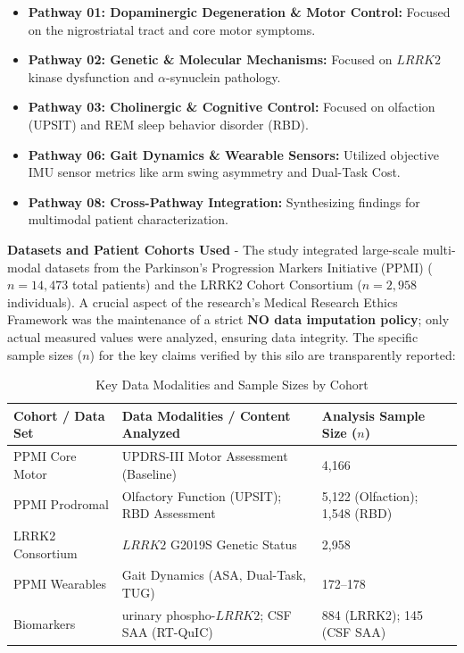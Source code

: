 \documentclass[11pt]{article}
\begin{document}
\begin{itemize}[noitemsep, topsep=0.5em, partopsep=0pt, parsep=0pt]
    \item \textbf{Pathway 01: Dopaminergic Degeneration \& Motor Control:} Focused on the nigrostriatal tract and core motor symptoms.
    \item \textbf{Pathway 02: Genetic \& Molecular Mechanisms:} Focused on $LRRK2$ kinase dysfunction and $\alpha$-synuclein pathology.
    \item \textbf{Pathway 03: Cholinergic \& Cognitive Control:} Focused on olfaction (UPSIT) and REM sleep behavior disorder (RBD).
    \item \textbf{Pathway 06: Gait Dynamics \& Wearable Sensors:} Utilized objective IMU sensor metrics like arm swing asymmetry and Dual-Task Cost.
    \item \textbf{Pathway 08: Cross-Pathway Integration:} Synthesizing findings for multimodal patient characterization.
\end{itemize}

\textbf{Datasets and Patient Cohorts Used} - 
The study integrated large-scale multi-modal datasets from the Parkinson’s Progression Markers Initiative (PPMI) ($n=14,473$ total patients) and the LRRK2 Cohort Consortium ($n=2,958$ individuals). A crucial aspect of the research's Medical Research Ethics Framework was the maintenance of a strict \textbf{NO data imputation policy}; only actual measured values were analyzed, ensuring data integrity.
The specific sample sizes ($n$) for the key claims verified by this silo are transparently reported:

\begin{table}[H]
\centering
\caption{Key Data Modalities and Sample Sizes by Cohort \cite{tirhekar2025comprehensive}}
\label{tab:mechanism_cohorts_simple}
\small
\begin{tabularx}{\linewidth}{@{}Y Y Y@{}}
\toprule
\textbf{Cohort / Data Set} & \textbf{Data Modalities / Content Analyzed} & \textbf{Analysis Sample Size ($n$)} \\
\midrule
PPMI Core Motor & UPDRS-III Motor Assessment (Baseline) & 4,166 \\
PPMI Prodromal & Olfactory Function (UPSIT); RBD Assessment & 5,122 (Olfaction); 1,548 (RBD) \\
LRRK2 Consortium & $LRRK2$ G2019S Genetic Status & 2,958 \\
PPMI Wearables & Gait Dynamics (ASA, Dual-Task, TUG) & 172–178 \\
Biomarkers & urinary phospho-$LRRK2$; CSF SAA (RT-QuIC) & 884 (LRRK2); 145 (CSF SAA) \\
\bottomrule
\end{tabularx}
\end{table}
\end{document}
